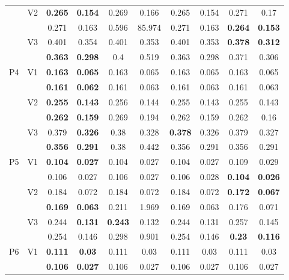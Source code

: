 \documentclass[12pt,a4paper]{article}
\begin{document}
\begin{sidewaystable}[ht]
{\begin{tabular}{cc|cc|cc|cc|cc|}
   & \multirow{2}{*}{V2} & \textbf{0.265} & \textbf{0.154} & 0.269 & 0.166 & 0.265 & 0.154 & 0.271 & 0.17 \\ 
   &  & 0.271 & 0.163 & 0.596 & 85.974 & 0.271 & 0.163 & \textbf{0.264} & \textbf{0.153} \\ 
   & \multirow{2}{*}{V3} & 0.401 & 0.354 & 0.401 & 0.353 & 0.401 & 0.353 & \textbf{0.378} & \textbf{0.312} \\ 
   &  & \textbf{0.363} & \textbf{0.298} & 0.4 & 0.519 & 0.363 & 0.298 & 0.371 & 0.306 \\ 
   \hline \hline\multirow{6}{*}{P4} & \multirow{2}{*}{V1} & \textbf{0.163} & \textbf{0.065} & 0.163 & 0.065 & 0.163 & 0.065 & 0.163 & 0.065 \\ 
   &  & \textbf{0.161} & \textbf{0.062} & 0.161 & 0.063 & 0.161 & 0.063 & 0.161 & 0.063 \\ 
   & \multirow{2}{*}{V2} & \textbf{0.255} & \textbf{0.143} & 0.256 & 0.144 & 0.255 & 0.143 & 0.255 & 0.143 \\ 
   &  & \textbf{0.262} & \textbf{0.159} & 0.269 & 0.194 & 0.262 & 0.159 & 0.262 & 0.16 \\ 
   & \multirow{2}{*}{V3} & 0.379 & \textbf{0.326} & 0.38 & 0.328 & \textbf{0.378} & 0.326 & 0.379 & 0.327 \\ 
   &  & \textbf{0.356} & \textbf{0.291} & 0.38 & 0.442 & 0.356 & 0.291 & 0.356 & 0.291 \\ 
   \hline \hline\multirow{6}{*}{P5} & \multirow{2}{*}{V1} & \textbf{0.104} & \textbf{0.027} & 0.104 & 0.027 & 0.104 & 0.027 & 0.109 & 0.029 \\ 
   &  & 0.106 & 0.027 & 0.106 & 0.027 & 0.106 & 0.028 & \textbf{0.104} & \textbf{0.026} \\ 
   & \multirow{2}{*}{V2} & 0.184 & 0.072 & 0.184 & 0.072 & 0.184 & 0.072 & \textbf{0.172} & \textbf{0.067} \\ 
   &  & \textbf{0.169} & \textbf{0.063} & 0.211 & 1.969 & 0.169 & 0.063 & 0.176 & 0.071 \\ 
   & \multirow{2}{*}{V3} & 0.244 & \textbf{0.131} & \textbf{0.243} & 0.132 & 0.244 & 0.131 & 0.257 & 0.145 \\ 
   &  & 0.254 & 0.146 & 0.298 & 0.901 & 0.254 & 0.146 & \textbf{0.23} & \textbf{0.116} \\ 
   \hline \hline\multirow{6}{*}{P6} & \multirow{2}{*}{V1} & \textbf{0.111} & \textbf{0.03} & 0.111 & 0.03 & 0.111 & 0.03 & 0.111 & 0.03 \\ 
   &  & \textbf{0.106} & \textbf{0.027} & 0.106 & 0.027 & 0.106 & 0.027 & 0.106 & 0.027 \\ 

\end{tabular}}
\end{sidewaystable}
\end{document}
